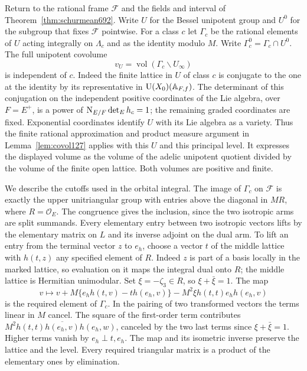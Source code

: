 \documentclass[a4paper,11pt]{article}
\theoremstyle{definition}
\theoremstyle{remark}
\numberwithin{equation}{section}
\begin{document}
Return to the rational frame \(\mathcal F\) and the fields and
interval of Theorem~\ref{thm:schurmean692}. Write \(U\) for
the Bessel unipotent group and \(U^0\) for the subgroup that
fixes \(\mathcal F\) pointwise. For a class \(c\) let \(\Gamma_c\)
be the rational elements of \(U\) acting integrally on
\(\Lambda_c\) and as the identity modulo \(M\). Write
\(\Gamma_c^0=\Gamma_c\cap U^0\). The full unipotent covolume
\[
               v_U=\operatorname{vol}(\Gamma_c\backslash U_\infty)
\]
is independent of \(c\). Indeed the finite lattice in \(U\) of
class \(c\) is conjugate to the one at the identity by its
representative in \({\rm U}(X_0)(\mathbb A_{F,f})\). The determinant
of this conjugation on the independent positive coordinates of
the Lie algebra, over \(F=E^+\), is a power of
\({\rm N}_{E/F}\det_E h_c=1\); the remaining graded
coordinates are fixed. Exponential coordinates identify \(U\)
with its Lie algebra as a variety. Thus the finite rational
approximation and product measure argument in
Lemma~\ref{lem:covol127} applies with this \(U\) and this
principal level. It expresses the displayed volume as the
volume of the adelic unipotent quotient divided by the volume
of the finite open lattice. Both volumes are positive and finite.

We describe the cutoffs used in the orbital integral. The image
of \(\Gamma_c\) on \(\mathcal F\) is exactly the upper
unitriangular group with entries above the diagonal in \(MR\),
where \(R=\mathcal O_E\). The congruence gives the inclusion,
since the two isotropic arms are split summands. Every elementary
entry between two isotropic vectors lifts by the elementary
matrix on \(L\) and its inverse adjoint on the dual arm. To
lift an entry from the terminal vector \(z\) to \(e_h\), choose
a vector \(t\) of the middle lattice with \(h(t,z)\) any specified
element of \(R\). Indeed \(z\) is part of a basis locally in the
marked lattice, so evaluation on it maps the integral dual onto
\(R\); the middle lattice is Hermitian unimodular. Set
\(\xi=-\zeta_3\in R\), so \(\xi+\bar\xi=1\). The map
\[
 v\longmapsto v+M\{e_h h(t,v)-t h(e_h,v)\}
              -M^2\xi h(t,t)e_h h(e_h,v)
\]
is the required element of \(\Gamma_c\). In the pairing of
two transformed vectors the terms linear in \(M\) cancel.
The square of the first-order term contributes
\(M^2h(t,t)\overline{h(e_h,v)}h(e_h,w)\), canceled by the
two last terms since \(\xi+\bar\xi=1\). Higher terms vanish
by \(e_h\perp t,e_h\). The map and its isometric inverse
preserve the lattice and the level. Every required triangular
matrix is a product of the elementary ones by elimination.
\end{document}
